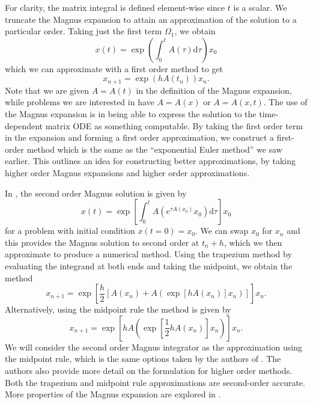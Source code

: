 For clarity, the matrix integral is defined element-wise since $t$ is a scalar.
We truncate the Magnus expansion to attain an approximation of the solution to a particular order.
Taking just the first term $\Omega_1$, we obtain
\begin{equation*}
    x(t) = \exp\left( \int_{0}^{t} A(\tau) \mathrm{d}\tau \right)x_0
\end{equation*}
which we can approximate with a first order method to get
\begin{equation*}
    x_{n+1} = \exp\left( h A(t_n) \right)x_n.
\end{equation*}
Note that we are given $A = A(t)$ in the definition of the Magnus expansion,
while problems we are interested in have $A=A(x)$ or $A=A(x,t)$.
The use of the Magnus expansion is in being able to express the solution to the time-dependent matrix ODE as something computable.
By taking the first order term in the expansion and forming a first order approximation, we construct a first-order method which is the same as the ``exponential Euler method''  we saw earlier.
This outlines an idea for constructing better approximations, by taking higher order Magnus expansions and higher order approximations.

In \cite{blanes_pos_2022}, the second order Magnus solution is given by
\begin{equation*}
    x(t) = \exp \left[ \int_{0}^{t} A \left( e^{\tau A(x_0)} x_0 \right) \mathrm{d}\tau \right]x_0
\end{equation*}
for a problem with initial condition $x(t=0) = x_0$.
We can swap $x_0$ for $x_n$ and this provides the Magnus solution to second order at $t_n + h$,
which we then approximate to produce a numerical method.
Using the trapezium method by evaluating the integrand at both ends and taking the midpoint,
we obtain the method
\begin{equation*}
    x_{n+1} = \exp \left[ \frac{h}{2}\left[ A(x_n) + A\left(
        \exp \left[ h A(x_n) \right]x_n
    \right) \right] \right]x_n.
\end{equation*}
Alternatively, using the midpoint rule the method is given by
\begin{equation}
    x_{n+1} = \exp\left[h A \left( \exp\left[\frac{1}{2}h A(x_n)\right] x_n \right) \right] x_n.
    \label{eqn:secondordermagnus}
\end{equation}
We will consider the second order Magnus integrator as the approximation using the midpoint rule, which is the same options taken by the authors of \cite{blanes_pos_2022}.
The authors also provide more detail on the formulation for higher order methods.
Both the trapezium and midpoint rule approximations are second-order accurate.
More properties of the Magnus expansion are explored in \cite{blanesmagnus2009}.

